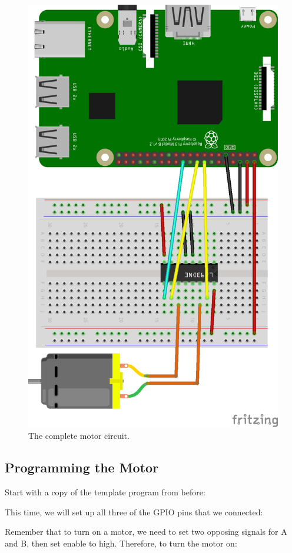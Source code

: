		\begin{figure}[h]
			\centering
			\includegraphics[width=0.6\linewidth]{McrRaspJam/011_Motors/2_motor/schematic_5}
			\caption{The complete motor circuit.}
			\label{fig:schematic_5}
		\end{figure}
		
	\subsection{Programming the Motor}
	
		Start with a copy of the template program from before:
		
		
		
		This time, we will set up all three of the GPIO pins that we connected:
	
		
		
		Remember that to turn on a motor, we need to set two opposing signals for A and B, then set enable to high. Therefore, to turn the motor on:
		
		
		
